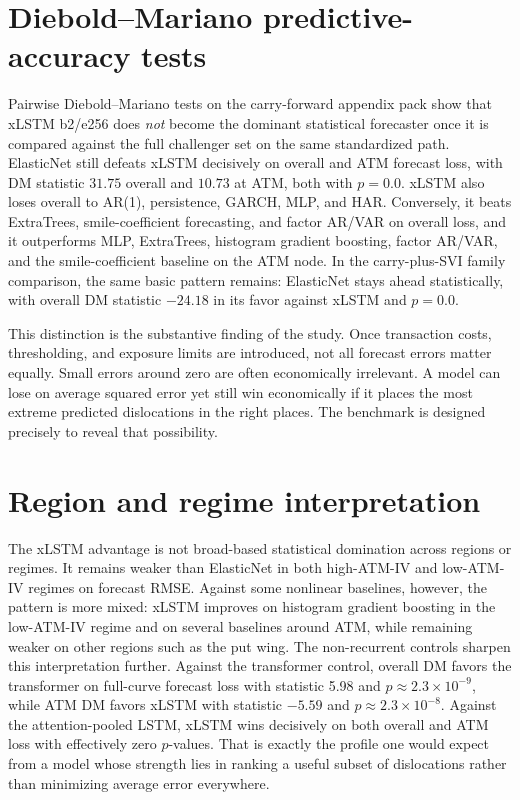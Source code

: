 \documentclass[12pt]{report}
\begin{document}
\section{Diebold--Mariano predictive-accuracy tests}
Pairwise Diebold--Mariano tests \citep{diebold1995} on the carry-forward appendix pack show that xLSTM b2/e256 does \emph{not} become the dominant statistical forecaster once it is compared against the full challenger set on the same standardized path. ElasticNet still defeats xLSTM decisively on overall and ATM forecast loss, with DM statistic \(31.75\) overall and \(10.73\) at ATM, both with \(p=0.0\). xLSTM also loses overall to AR(1), persistence, GARCH, MLP, and HAR. Conversely, it beats ExtraTrees, smile-coefficient forecasting, and factor AR/VAR on overall loss, and it outperforms MLP, ExtraTrees, histogram gradient boosting, factor AR/VAR, and the smile-coefficient baseline on the ATM node. In the carry-plus-SVI family comparison, the same basic pattern remains: ElasticNet stays ahead statistically, with overall DM statistic \(-24.18\) in its favor against xLSTM and \(p=0.0\).

This distinction is the substantive finding of the study. Once transaction costs, thresholding, and exposure limits are introduced, not all forecast errors matter equally. Small errors around zero are often economically irrelevant. A model can lose on average squared error yet still win economically if it places the most extreme predicted dislocations in the right places. The benchmark is designed precisely to reveal that possibility.

\section{Region and regime interpretation}
The xLSTM advantage is not broad-based statistical domination across regions or regimes. It remains weaker than ElasticNet in both high-ATM-IV and low-ATM-IV regimes on forecast RMSE. Against some nonlinear baselines, however, the pattern is more mixed: xLSTM improves on histogram gradient boosting in the low-ATM-IV regime and on several baselines around ATM, while remaining weaker on other regions such as the put wing. The non-recurrent controls sharpen this interpretation further. Against the transformer control, overall DM favors the transformer on full-curve forecast loss with statistic 5.98 and \(p \approx 2.3\times10^{-9}\), while ATM DM favors xLSTM with statistic \(-5.59\) and \(p \approx 2.3\times10^{-8}\). Against the attention-pooled LSTM, xLSTM wins decisively on both overall and ATM loss with effectively zero \(p\)-values. That is exactly the profile one would expect from a model whose strength lies in ranking a useful subset of dislocations rather than minimizing average error everywhere.
\end{document}
